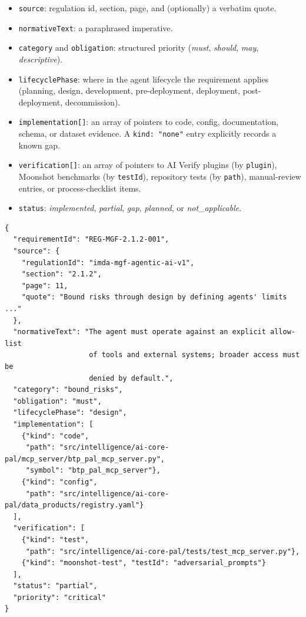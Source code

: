 \begin{itemize}
  \item \texttt{source}: regulation id, section, page, and (optionally) a
        verbatim quote.
  \item \texttt{normativeText}: a paraphrased imperative.
  \item \texttt{category} and \texttt{obligation}: structured priority
        (\emph{must}, \emph{should}, \emph{may}, \emph{descriptive}).
  \item \texttt{lifecyclePhase}: where in the agent lifecycle the
        requirement applies (planning, design, development,
        pre-deployment, deployment, post-deployment, decommission).
  \item \texttt{implementation[]}: an array of pointers to code, config,
        documentation, schema, or dataset evidence. A \texttt{kind: "none"}
        entry explicitly records a known gap.
  \item \texttt{verification[]}: an array of pointers to AI Verify plugins
        (by \texttt{plugin}), Moonshot benchmarks (by \texttt{testId}),
        repository tests (by \texttt{path}), manual-review entries, or
        process-checklist items.
  \item \texttt{status}: \emph{implemented}, \emph{partial}, \emph{gap},
        \emph{planned}, or \emph{not\_applicable}.
\end{itemize}

\begin{lstlisting}[language=jsonx,caption={Example requirement with
implementation and verification arrays (excerpt).},label={lst:req-example}]
{
  "requirementId": "REG-MGF-2.1.2-001",
  "source": {
    "regulationId": "imda-mgf-agentic-ai-v1",
    "section": "2.1.2",
    "page": 11,
    "quote": "Bound risks through design by defining agents' limits ..."
  },
  "normativeText": "The agent must operate against an explicit allow-list
                    of tools and external systems; broader access must be
                    denied by default.",
  "category": "bound_risks",
  "obligation": "must",
  "lifecyclePhase": "design",
  "implementation": [
    {"kind": "code",
     "path": "src/intelligence/ai-core-pal/mcp_server/btp_pal_mcp_server.py",
     "symbol": "btp_pal_mcp_server"},
    {"kind": "config",
     "path": "src/intelligence/ai-core-pal/data_products/registry.yaml"}
  ],
  "verification": [
    {"kind": "test",
     "path": "src/intelligence/ai-core-pal/tests/test_mcp_server.py"},
    {"kind": "moonshot-test", "testId": "adversarial_prompts"}
  ],
  "status": "partial",
  "priority": "critical"
}
\end{lstlisting}

